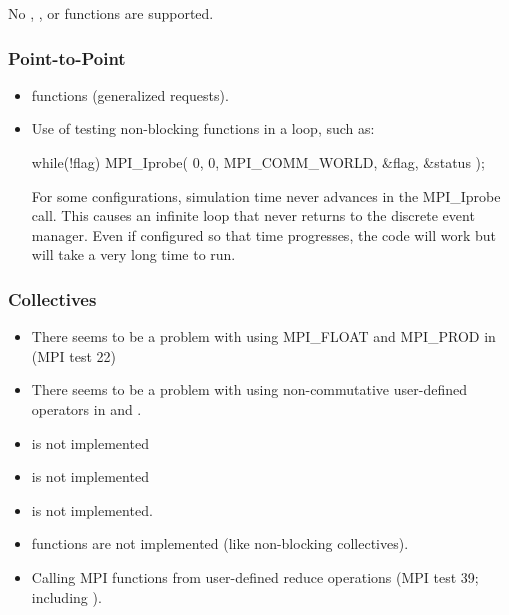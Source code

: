 No , , or  functions are supported.

\subsubsection{Point-to-Point}
\label{subsubsec:issues:mpi:ptpt}

\begin{itemize}
\item {} functions (generalized requests).
\item Use of testing non-blocking functions in a loop, such as:


\begin{CppCode}
while(!flag)
{
  MPI_Iprobe( 0, 0, MPI_COMM_WORLD, &flag, &status );
}
\end{CppCode}

For some configurations, simulation time never advances in the MPI\_Iprobe call. 
This causes an infinite loop that never returns to the discrete event manager. 
Even if configured so that time progresses, the code will work but will take a very long time to run.
	
\end{itemize}


\subsubsection{Collectives}
\label{subsubsec:issues:mpi:collectives}

\begin{itemize}
\item There seems to be a problem with using MPI\_FLOAT and MPI\_PROD in  (MPI test 22)
\item There seems to be a problem with using non-commutative user-defined operators in  and .
\item {} is not implemented
\item {} is not implemented
\item {} is not implemented.
\item {} functions are not implemented  (like non-blocking collectives).
\item Calling MPI functions from user-defined reduce operations (MPI test 39; including ).
\end{itemize}


